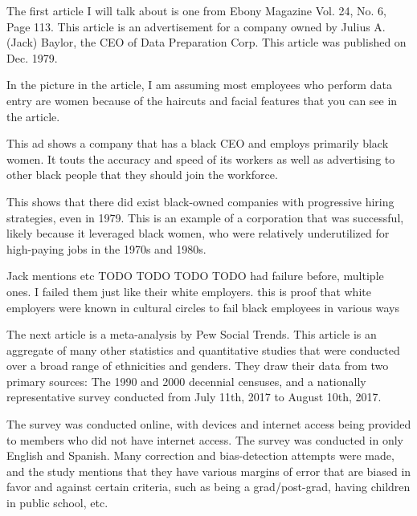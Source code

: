 \documentclass[a4paper,12pt]{article}
\begin{document}



	The first article I will talk about is one from Ebony Magazine Vol. 24, No. 6, Page 113\cite{punchcardpros}. This article is an advertisement for a company owned by Julius A. (Jack) Baylor, the CEO of Data Preparation Corp. This article was published on Dec. 1979.

	In the picture in the article, I am assuming most employees who perform data entry are women because of the haircuts and facial features that you can see in the article.

	This ad shows a company that has a black CEO and employs primarily black women. It touts the accuracy and speed of its workers as well as advertising to other black people that they should join the workforce. 
	
	This shows that there did exist black-owned companies with progressive hiring strategies, even in 1979. This is an example of a corporation that was successful, likely %
	because it leveraged black women, who were relatively underutilized for high-paying jobs in the 1970s and 1980s. %

	Jack mentions etc TODO TODO TODO TODO had failure before, multiple ones. I failed them just like their white employers. this is proof that white employers were known in cultural circles to fail black employees in various ways

	The next article\cite{pew} is a meta-analysis %
by Pew Social Trends. This article is an aggregate of many other statistics and quantitative studies that were conducted over a broad range of ethnicities and genders. They draw their data from two primary sources: The 1990 and 2000 decennial censuses, and a nationally representative %
survey conducted from July 11th, 2017 to August 10th, 2017. 


	The survey was conducted online, with devices and internet access being provided to members who did not have internet access. The survey was conducted in only English and Spanish. Many correction and bias-detection attempts were made, and the study mentions that they have various margins of error that are biased in favor and against certain criteria, such as being a grad/post-grad, having children in public school, etc.
\end{document}
